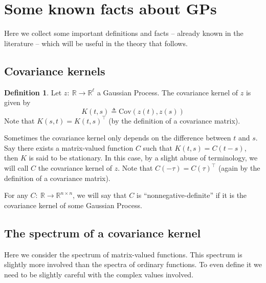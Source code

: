 \documentclass{article}
\theoremstyle{definition}
\newtheorem*{definition*}{Definition}
\newcommand{\Cov}{\mathrm{Cov}}
\begin{document}
                                                               

\section{Some known facts about GPs}

Here we collect some important definitions and facts -- already known in the literature --  which will be useful in the theory that follows.  

\subsection{Covariance kernels}

\begin{definition*}  Let $z:\ \mathbb{R} \rightarrow \mathbb{R}^\ell$ a Gaussian Process.  The covariance kernel of $z$ is given by
\[
K(t,s)\triangleq \Cov(z(t),z(s))
\]
Note that $K(s,t)= K(t,s)^\top$ (by the definition of a covariance matrix).  

Sometimes the covariance kernel only depends on the difference between $t$ and $s$.  Say there exists a matrix-valued function $C$ such that $K(t,s)=C(t-s)$, then $K$ is said to be stationary.  In this case, by a slight abuse of terminology, we will call $C$ the covariance kernel of $z$.  Note that $C(-\tau)=C(\tau)^\top$ (again by the definition of a covariance matrix).  

For any $C:\ \mathbb{R}\rightarrow\mathbb{R}^{n\times n}$, we will say that $C$ is ``nonnegative-definite'' if it is the covariance kernel of some Gaussian Process.  
\end{definition*}

\subsection{The spectrum of a covariance kernel}

\label{subsec:spectrumgeneral}

Here we consider the spectrum of matrix-valued functions.  This spectrum is slightly more involved than the spectra of ordinary functions.  To even define it we need to be slightly careful with the complex values involved.
\end{document}
